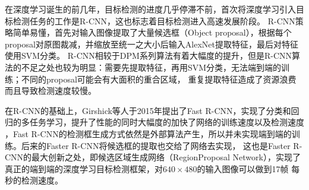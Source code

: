 在深度学习诞生的前几年，目标检测的进度几乎停滞不前，首次将深度学习引入目标检测任务的工作是R-CNN\cite{girshick2014rich}，这也标志着目标检测进入高速发展阶段。
R-CNN策略简单易懂，首先对输入图像提取了大量候选框（Object proposal），根据每个proposal对原图裁减，并缩放至统一之大小后输入AlexNet提取特征，最后对特征使用SVM分类。
R-CNN相较于DPM系列算法有着大幅度的提升，但是R-CNN算法的不足之处也较为明显：需要先提取特征，再用SVM分类，无法端到端的训练；不同的proposal可能会有大面积的重合区域，
重复提取特征造成了资源浪费而且导致检测速度较慢。


在R-CNN的基础上，Girshick等人于2015年提出了Fast R-CNN\cite{girshick2015fast}，实现了分类和回归的多任务学习，提升了性能的同时大幅度的加快了网络的训练速度以及检测速度
，Fast R-CNN的检测框生成方式依然是外部算法产生，所以并未实现端到端的训练。后来的Faster R-CNN\cite{ren2015faster}将候选框的提取也交给了网络去实现，
这也是Faster R-CNN的最大创新之处，即候选区域生成网络（RegionProposal Network），实现了真正的端到端的深度学习目标检测框架，对$640 \times 480$的输入图像可以做到17帧
每秒的检测速度。



